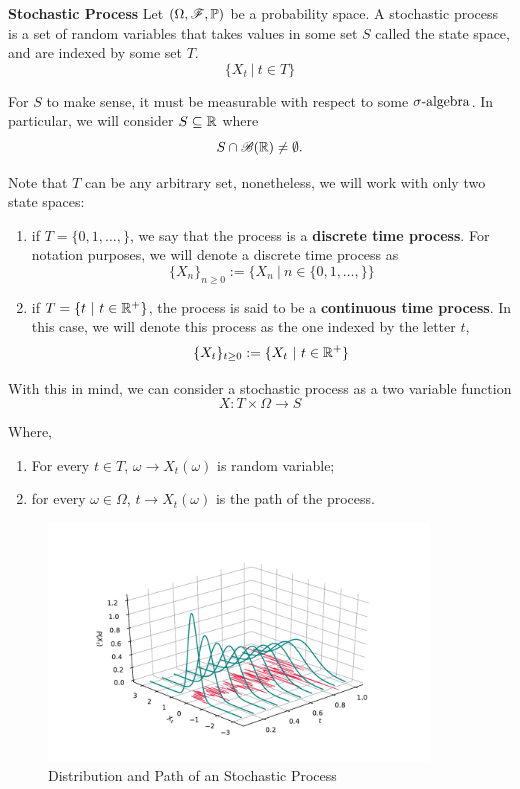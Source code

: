 \documentclass[../TGMAFFIRO.tex]{subfiles}
\begin{document}
\begin{definition}\textbf{Stochastic Process}
	Let $(\Omega, \mathscr{F}, \mathbb{P})$ be a probability space. A stochastic process is a set of random variables that takes values in some set $S$ called the state space, and are indexed by some set $T$.
	\begin{equation}
		\{X_t \ | \ t \in T\}
	\end{equation}
\end{definition}

For $S$ to make sense, it must be measurable with respect to some $\sigma\text{-algebra}$. In particular, we will consider $S \subseteq \mathbb{R}$ where
\[
	S \cap \mathscr{B}(\mathbb{R}) \neq \emptyset.
\]

Note that $T$ can be any arbitrary set, nonetheless, we will work with only two state spaces:
\begin{enumerate}
	\item if $T = \{0, 1, \ldots, \}$, we say that the process is a \textbf{discrete time process}. For notation purposes, we will denote a discrete time process as
	\begin{equation}
		\{X_n\}_{n\geq 0}:= \{X_n \ | \ n \in \{0, 1, \ldots, \}\}
	\end{equation}
	
	\item if $T = \{t \ | \ t\in\RNums^+\}$, the process is said to be a \textbf{continuous time process}. In this case, we will denote this process as the one indexed by the letter $t$,
	\begin{equation}
		\{X_t\}_{t\geq 0} := \{X_t \ | \ t \in \mathbb{R}^+\}
	\end{equation}
\end{enumerate}

With this in mind, we can consider a stochastic process as a two variable function
\[
	X: T\times\Omega \to S
\]

Where,
\begin{enumerate}
	\item For every $t\in T$, $\omega \to X_t(\omega)$ is random variable;
	\item for every $\omega \in \Omega$, $t \to X_t(\omega)$ is the path of the process.
\end{enumerate}

\begin{figure}[h]
	\centering	
	\includegraphics[width=0.9\textwidth]{images/stoch_process_3d}
	\caption{Distribution and Path of an Stochastic Process}
\end{figure}
\end{document}
